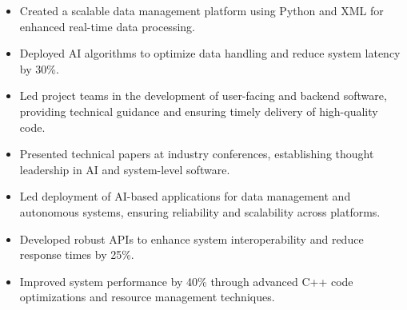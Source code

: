 \par\smallskip
\noindent
\begin{minipage}{20cm}
  \begin{minipage}{9.75cm}
    \begin{itemize}
      \item Created a scalable data management platform using Python and XML for enhanced real-time data processing.
      \item Deployed AI algorithms to optimize data handling and reduce system latency by 30\%.
    \end{itemize}
  \end{minipage}
  \hfill
  \begin{minipage}{9.75cm}
    \begin{itemize}
      \item Led project teams in the development of user-facing and backend software, providing technical guidance and ensuring timely delivery of high-quality code.
      \item Presented technical papers at industry conferences, establishing thought leadership in AI and system-level software.
    \end{itemize}
  \end{minipage}
\end{minipage}
\par\smallskip
\divider

\par\smallskip
\noindent
\begin{minipage}{20cm}
  \begin{minipage}{9.75cm}
    \begin{itemize}
      \item Led deployment of AI-based applications for data management and autonomous systems, ensuring reliability and scalability across platforms.
      \item Developed robust APIs to enhance system interoperability and reduce response times by 25\%.
    \end{itemize}
  \end{minipage}
  \hfill
  \begin{minipage}{9.75cm}
    \begin{itemize}
      \item Improved system performance by 40\% through advanced C++ code optimizations and resource management techniques.
    \end{itemize}
  \end{minipage}
\end{minipage}


